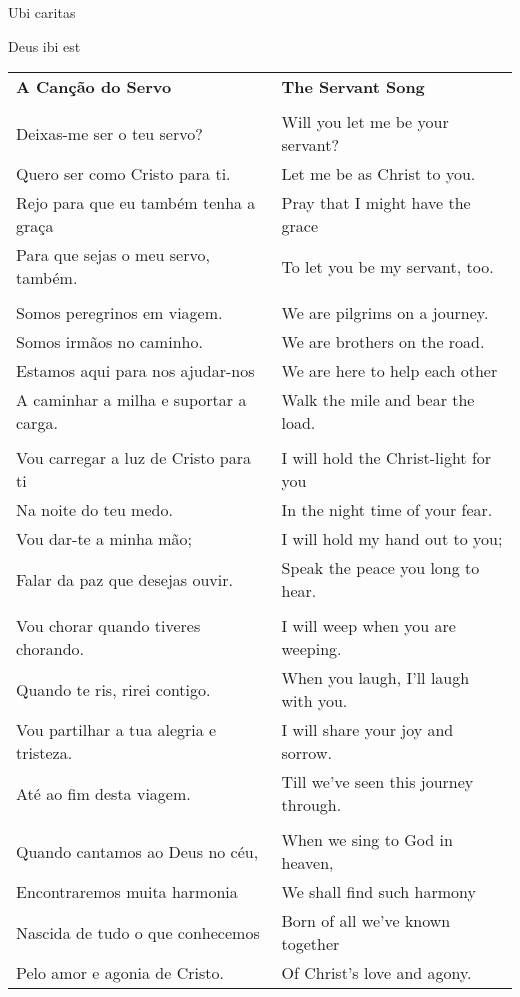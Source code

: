 Ubi caritas

Deus ibi est


{}


\begin{longtable}{L{1.7in}R{1.7in}}
\textbf{A Canção do Servo} & \textbf{The Servant Song}\\
\\
Deixas-me ser o teu servo? & Will you let me be your servant?\\
Quero ser como Cristo para ti. & Let me be as Christ to you.\\
Rejo para que eu também tenha a graça & Pray that I might have the grace\\
Para que sejas o meu servo, também. & To let you be my servant, too.\\
\\
Somos peregrinos em viagem. & We are pilgrims on a journey.\\
Somos irmãos no caminho. & We are brothers on the road.\\
Estamos aqui para nos ajudar-nos & We are here to help each other\\
A caminhar a milha e suportar a carga. & Walk the mile and bear the load.\\
\\
Vou carregar a luz de Cristo para ti & I will hold the Christ-light for you\\
Na noite do teu medo. & In the night time of your fear.\\
Vou dar-te a minha mão; & I will hold my hand out to you;\\
Falar da paz que desejas ouvir. & Speak the peace you long to hear.\\
\\
Vou chorar quando tiveres chorando. & I will weep when you are weeping.\\
Quando te ris, rirei contigo. & When you laugh, I'll laugh with you.\\
Vou partilhar a tua alegria e tristeza. & I will share your joy and sorrow.\\
Até ao fim desta viagem. & Till we've seen this journey through.\\
\\
Quando cantamos ao Deus no céu, & When we sing to God in heaven,\\
Encontraremos muita harmonia & We shall find such harmony\\
Nascida de tudo o que conhecemos & Born of all we've known together\\
Pelo amor e agonia de Cristo. & Of Christ's love and agony.\\
\end{longtable}

